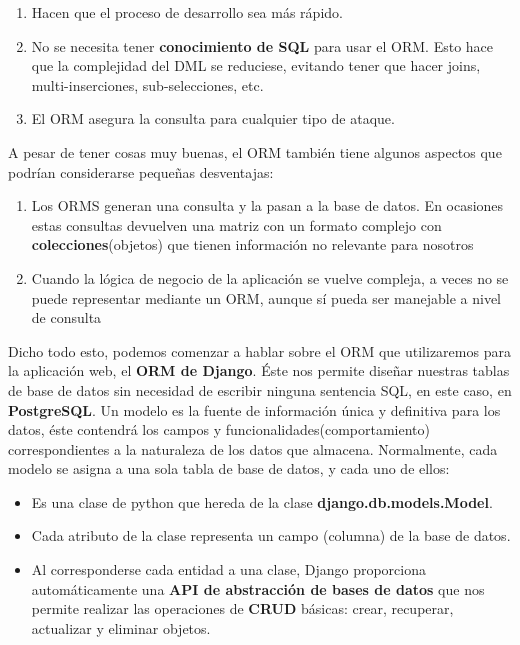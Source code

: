         \begin{enumerate}
            \item Hacen que el proceso de desarrollo sea más rápido.
            \item No se necesita tener \textbf{conocimiento de SQL } para usar el ORM. Esto
            hace que la complejidad del DML se reduciese, evitando tener que hacer joins,
            multi-inserciones, sub-selecciones, etc.
            \item El ORM asegura la consulta para cualquier tipo de ataque.
        \end{enumerate}

    A pesar de tener cosas muy buenas, el ORM también tiene algunos aspectos que podrían
    considerarse pequeñas desventajas:

        \begin{enumerate}
            \item Los ORMS generan una consulta y la pasan a la base de datos. En ocasiones
            estas consultas devuelven una matriz con un formato complejo con
            \textbf{colecciones}(objetos) que tienen información no relevante para nosotros
            \item Cuando la lógica de negocio de la aplicación se vuelve compleja, a veces
            no se puede representar mediante un ORM, aunque sí pueda ser manejable a nivel
            de consulta
        \end{enumerate}

    Dicho todo esto, podemos comenzar a hablar sobre el ORM que utilizaremos para la
    aplicación web, el \textbf{ORM de Django}. Éste nos permite diseñar nuestras tablas de 
    base de datos sin necesidad de escribir ninguna sentencia SQL, en este caso, en
    \textbf{PostgreSQL}. Un modelo es la fuente de información única y definitiva para los
    datos, éste contendrá los campos y funcionalidades(comportamiento) correspondientes a
    la naturaleza de los datos que almacena. Normalmente, cada modelo se asigna a una sola
    tabla de base de datos, y cada uno de ellos:

        \begin{itemize}
            \item Es una clase de python que hereda de la clase \textbf{django.db.models.Model}.
            \item Cada atributo de la clase representa un campo (columna) de la base de datos.
            \item Al corresponderse cada entidad a una clase, Django proporciona automáticamente
            una \textbf{API de abstracción de bases de datos} que nos permite realizar las
            operaciones de \textbf{CRUD} básicas: crear, recuperar, actualizar y eliminar
            objetos.
        \end{itemize}

